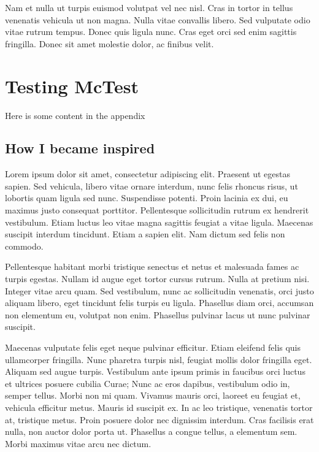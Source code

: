 \documentclass[runningheads,a4paper]{llncs}
\begin{document}
Nam et nulla ut turpis euismod volutpat vel nec nisl. Cras in tortor in tellus venenatis vehicula ut non magna. Nulla vitae convallis libero. Sed vulputate odio vitae rutrum tempus. Donec quis ligula nunc. Cras eget orci sed enim sagittis fringilla. Donec sit amet molestie dolor, ac finibus velit.
%
\newpage
%


%
\newpage
%
\appendix
\section{Testing McTest}
Here is some content in the appendix

\begin{subappendices}
\subsection{How I became inspired}
Lorem ipsum dolor sit amet, consectetur adipiscing elit. Praesent ut egestas sapien. Sed vehicula, libero vitae ornare interdum, nunc felis rhoncus risus, ut lobortis quam ligula sed nunc. Suspendisse potenti. Proin lacinia ex dui, eu maximus justo consequat porttitor. Pellentesque sollicitudin rutrum ex hendrerit vestibulum. Etiam luctus leo vitae magna sagittis feugiat a vitae ligula. Maecenas suscipit interdum tincidunt. Etiam a sapien elit. Nam dictum sed felis non commodo.

Pellentesque habitant morbi tristique senectus et netus et malesuada fames ac turpis egestas. Nullam id augue eget tortor cursus rutrum. Nulla at pretium nisi. Integer vitae arcu quam. Sed vestibulum, nunc ac sollicitudin venenatis, orci justo aliquam libero, eget tincidunt felis turpis eu ligula. Phasellus diam orci, accumsan non elementum eu, volutpat non enim. Phasellus pulvinar lacus ut nunc pulvinar suscipit.

Maecenas vulputate felis eget neque pulvinar efficitur. Etiam eleifend felis quis ullamcorper fringilla. Nunc pharetra turpis nisl, feugiat mollis dolor fringilla eget. Aliquam sed augue turpis. Vestibulum ante ipsum primis in faucibus orci luctus et ultrices posuere cubilia Curae; Nunc ac eros dapibus, vestibulum odio in, semper tellus. Morbi non mi quam. Vivamus mauris orci, laoreet eu feugiat et, vehicula efficitur metus. Mauris id suscipit ex. In ac leo tristique, venenatis tortor at, tristique metus. Proin posuere dolor nec dignissim interdum. Cras facilisis erat nulla, non auctor dolor porta ut. Phasellus a congue tellus, a elementum sem. Morbi maximus vitae arcu nec dictum.


\end{subappendices}
\end{document}
